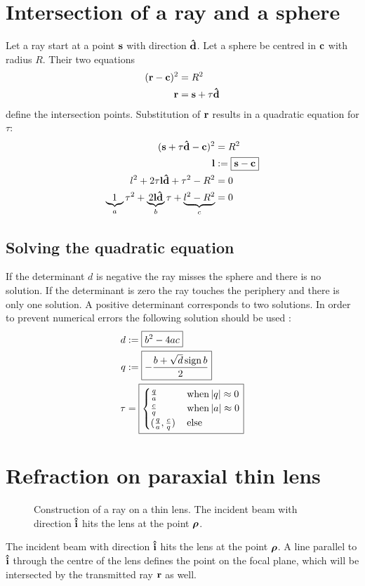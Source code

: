 \section{Intersection of a ray and a sphere}
Let a ray start at a point $\mathbf{s}$ with direction $\mathbf{\hat{d}}$.  Let a sphere be
centred in $\mathbf{c}$ with radius $R$. Their two equations
\begin{align}
  (\mathbf{r}-\mathbf{c})^2&=R^2\\
  \mathbf{r}&=\mathbf{s}+\tau\mathbf{\hat{d}}
\end{align}
define the intersection points. Substitution of $\mathbf{r}$ results in a
quadratic equation for $\tau$:
\begin{align}
  (\mathbf{s}+\tau\mathbf{\hat{d}}-\mathbf{c})^2&=R^2\\
  \mathbf{l}&:=\boxed{\mathbf{s}-\mathbf{c}}\\
  l^2+2\tau\mathbf{l}\mathbf{\hat{d}}+\tau^2-R^2&=0\\
  \underbrace{1}_a\tau^2+\underbrace{2\mathbf{l}\mathbf{\hat{d}}}_b\tau+\underbrace{l^2-R^2}_c&=0
\end{align}
\subsection{Solving the quadratic equation}
If the determinant $d$ is negative the ray misses the sphere and there
is no solution. If the determinant is zero the ray touches the
periphery and there is only one solution. A positive determinant
corresponds to two solutions. In order to prevent numerical errors the following solution should be used \citep{Press1997}: 
\begin{align}
  d&:=\boxed{b^2-4ac}\\
  q&:=\boxed{-\frac{b+\sqrt{d}\operatorname{sign} b}{2}}\\
  \tau&=\boxed{
  \begin{cases}
    \frac{q}{a} &\,\textrm{when}\,\mathopen| q \mathclose|\approx 0\\ 
    \frac{c}{q} &\,\textrm{when}\,\mathopen| a \mathclose|\approx 0\\
    (\frac{q}{a}, \frac{c}{q}) &\,\textrm{else}
  \end{cases}}
\end{align}
\section{Refraction on paraxial thin lens}
\begin{figure}[!hbt]
  \centering
  
  \caption{Construction of a ray on a thin lens. The incident beam
    with direction $\mathbf{\hat{i}}$ hits the lens at the point $\boldsymbol\rho$.}
\end{figure}
The incident beam with direction $\mathbf{\hat{i}}$ hits the lens at the point
$\boldsymbol\rho$. A line parallel to $\mathbf{\hat{i}}$ through the centre of the lens
defines the point on the focal plane, which will be intersected by the
transmitted ray $\mathbf{r}$ as well.

